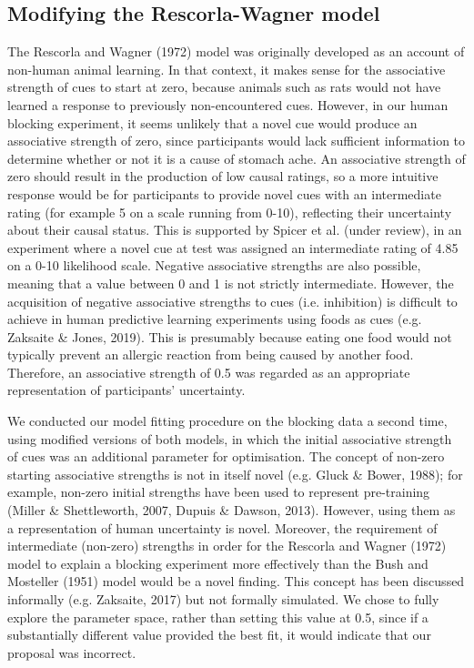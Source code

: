 \documentclass[twocolumn]{article}
\begin{document}
\subsection{Modifying the Rescorla-Wagner model}

The Rescorla and Wagner (1972) model was originally developed as an
account of non-human animal learning. In that context, it makes sense
for the associative strength of cues to start at zero, because animals
such as rats would not have learned a response to previously
non-encountered cues. However, in our human blocking experiment, it
seems unlikely that a novel cue would produce an associative strength of
zero, since participants would lack sufficient information to determine
whether or not it is a cause of stomach ache. An associative strength of
zero should result in the production of low causal ratings, so a more
intuitive response would be for participants to provide novel cues with
an intermediate rating (for example 5 on a scale running from 0-10),
reflecting their uncertainty about their causal status. This is
supported by Spicer et al. (under review), in an experiment where a
novel cue at test was assigned an intermediate rating of 4.85 on a 0-10
likelihood scale. Negative associative strengths are also possible,
meaning that a value between 0 and 1 is not strictly intermediate.
However, the acquisition of negative associative strengths to cues (i.e.
inhibition) is difficult to achieve in human predictive learning
experiments using foods as cues (e.g. Zaksaite \& Jones, 2019). This is
presumably because eating one food would not typically prevent an
allergic reaction from being caused by another food. Therefore, an
associative strength of 0.5 was regarded as an appropriate
representation of participants' uncertainty.

We conducted our model fitting procedure on the blocking data a second
time, using modified versions of both models, in which the initial
associative strength of cues was an additional parameter for
optimisation. The concept of non-zero starting associative strengths is
not in itself novel (e.g. Gluck \& Bower, 1988); for example, non-zero
initial strengths have been used to represent pre-training (Miller \&
Shettleworth, 2007, Dupuis \& Dawson, 2013). However, using them as a
representation of human uncertainty is novel. Moreover, the requirement
of intermediate (non-zero) strengths in order for the Rescorla and
Wagner (1972) model to explain a blocking experiment more effectively
than the Bush and Mosteller (1951) model would be a novel finding. This
concept has been discussed informally (e.g. Zaksaite, 2017) but not
formally simulated. We chose to fully explore the parameter space,
rather than setting this value at 0.5, since if a substantially
different value provided the best fit, it would indicate that our
proposal was incorrect.
\end{document}
